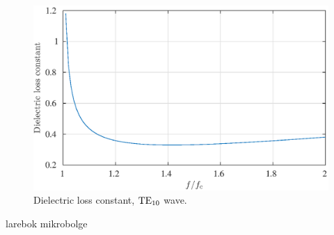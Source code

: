 \documentclass[12pt,a4paper, english, titlepage]{article}
\begin{document}
\begin{figure}[h t b p]
\centering
\includegraphics[width=\textwidth,keepaspectratio]{figures/dielec_loss_const.eps}
\caption{Dielectric loss constant, ${\rm TE}_{\rm 10}$ wave.}
\label{fig:dielec_loss_const}
\end{figure}







\begin{thebibliography}{9}
 larebok mikrobolge
\end{thebibliography}
\end{document}
